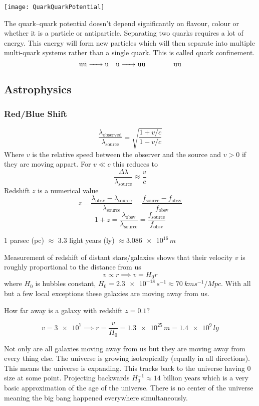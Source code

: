 \begin{center}
\texttt{[image: QuarkQuarkPotential]}
\end{center}

The quark--quark potential doesn't depend significantly on flavour, colour or whether it is a particle or antiparticle. Separating two quarks requires a lot of energy. This energy will form new particles which will then separate into multiple multi-quark systems rather than a single quark. This is called quark confinement.
\[\up\bar\up\ce{->}\up\quad\bar\up\ce{->}\up\bar\up\qquad\qquad\up\bar\up\]

\subsection*{Astrophysics}

\subsubsection*{Red/Blue Shift}

\[\frac{\lambda_{\mathrm{observed}}}{\lambda_{\mathrm{source}}}=\sqrt{\frac{1+v/c}{1-v/c}}\]
Where \(v\) is the relative speed between the observer and the source and \(v>0\) if they are moving appart. For \(v\ll c\) this reduces to
\[\frac{\Delta\lambda}{\lambda_{\mathrm{source}}}\approx\frac vc\]
Redshift \(z\) is a numerical value
\[z=\frac{\lambda_{\mathrm{obsv}}-\lambda_{\mathrm{source}}}{\lambda_{\mathrm{source}}}=\frac{f_{\mathrm{source}}-f_{\mathrm{obsv}}}{f_{\mathrm{obsv}}}\]
\[1+z=\frac{\lambda_{\mathrm{obsv}}}{\lambda_{\mathrm{source}}}=\frac{f_{\mathrm{source}}}{f_{\mathrm{obsv}}}\]

1 parsec (pc) \(\approx\) 3.3 light years (ly) \(\approx\num{3.086e16}\,\si{m}\)

Measurement of redshift of distant stars/galaxies shows that their velocity \(v\) is roughly proportional to the distance from us
\[v\propto r\implies v=H_0 r\]
where \(H_0\) is hubbles constant, \(H_0=\num{2.3e-18}\,\si{s^{-1}}\approx\SI{70}{kms^{-1}/Mpc}\). With all but a few local exceptions these galaxies are moving away from us.
\begin{example}
How far away is a galaxy with redshift \(z=0.1?\)

\[v=\num{3e7}\implies r=\frac{v}{H_0}=\num{1.3e25}\,\si{m}=\num{1.4e9}\,\si{ly}\]
\end{example}

Not only are all galaxies moving away from us but they are moving away from every thing else. The universe is growing isotropically (equally in all directions). This means the universe is expanding. This tracks back to the universe having 0 size at some point. Projecting backwards \(H_0^{-1}\approx14\) billion years which is a very basic approximation of the age of the universe. There is no center of the universe meaning the big bang happened everywhere simultaneously.


